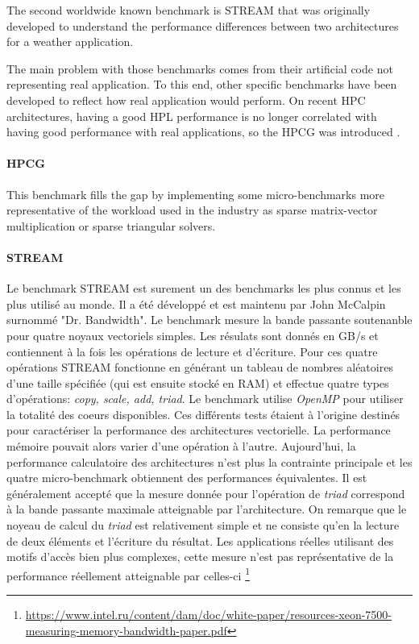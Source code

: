 The second worldwide known benchmark is STREAM \cite{HPC:stream} that was originally developed to understand the performance differences between two architectures for a weather application.

The main problem with those benchmarks comes from their artificial code not representing real application. To this end, other specific benchmarks have been developed to reflect how real application would perform. On recent HPC architectures, having a good HPL performance is no longer correlated with having good performance with real applications, so the HPCG was introduced \cite{HPC:hpcg}. 

\paragraph{HPCG} This benchmark fills the gap by implementing some micro-benchmarks more representative of the workload used in the industry as sparse matrix-vector multiplication or sparse triangular solvers.




    \paragraph{STREAM}
        Le benchmark STREAM est surement un des benchmarks les plus connus et les plus utilisé au monde. Il a été développé et est maintenu par John McCalpin surnommé "Dr. Bandwidth". Le benchmark mesure la bande passante soutenanble pour quatre noyaux vectoriels simples. Les résulats sont donnés en GB/s et contiennent à la fois les opérations de lecture et d'écriture. Pour ces quatre opérations STREAM fonctionne en générant un tableau de nombres aléatoires d'une taille spécifiée (qui est ensuite stocké en RAM) et effectue quatre types d'opérations: \textit{copy, scale, add, triad}.  Le benchmark utilise \textit{OpenMP} pour utiliser la totalité des coeurs disponibles. Ces différents tests étaient à l'origine destinés pour caractériser la performance des architectures vectorielle. La performance mémoire pouvait alors varier d'une opération à l'autre. Aujourd'hui, la performance calculatoire des architectures n'est plus la contrainte principale et les quatre micro-benchmark obtiennent des performances équivalentes. Il est généralement accepté que la mesure donnée pour l'opération de \textit{triad} correspond à la bande passante maximale atteignable par l'architecture. On remarque que le noyeau de calcul du \textit{triad} est relativement simple et ne consiste qu'en la lecture de deux éléments et l'écriture du résultat. Les applications réelles utilisant des motifs d'accès bien plus complexes, cette mesure n'est pas représentative de la performance réellement atteignable par celles-ci \footnote{\url{https://www.intel.ru/content/dam/doc/white-paper/resources-xeon-7500-measuring-memory-bandwidth-paper.pdf}}
        

